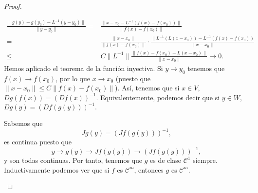 \begin{proof}
\begin{description}
	\[
	\begin{split}
		\frac{\|g\left(y\right)-g\left(y_{0}\right)-L^{-1}\left(y-y_{0}\right)\|}{\|y-y_{0}\|} = & \frac{\|x-x_{0}-L^{-1}\left(f\left(x\right)-f\left(x_{0}\right)\right)\|}{\|f\left(x\right)-f\left(x_{0}\right)\|} \\
		= & \frac{\|x-x_{0}\|}{\|f\left(x\right)-f\left(x_{0}\right)\|} \cdot \frac{\|L^{-1}\left(L\left(x-x_{0}\right)\right)-L^{-1}\left(f\left(x\right)-f\left(x_{0}\right)\right)}{\|x-x_{0}\|} \\
		\leq &  C \|L^{-1}\| \frac{\|f\left(x\right)-f\left(x_{0}\right)-L\left(x-x_{0}\right)\|}{\|x-x_{0}\|}  \to 0.
	\end{split}
	\]
	Hemos aplicado el teorema de la función inyectiva. Si $\displaystyle y \to y_{0} $ tenemos que $\displaystyle f\left(x\right) \to f\left(x_{0}\right) $, por lo que $\displaystyle x \to x_{0} $ (puesto que $\displaystyle \|x-x_{0}\| \leq C\|f\left(x\right)-f\left(x_{0}\right)\| $). 
Así, tenemos que si $\displaystyle x \in V $, $\displaystyle Dg\left(f\left(x\right)\right) = \left(Df\left(x\right)\right)^{-1} $. Equivalentemente, podemos decir que si $\displaystyle y \in W $, $\displaystyle Dg\left(y\right) = \left(Df\left(g\left(y\right)\right)\right)^{-1} $.
\item[Paso 6.] Sabemos que 
	\[Jg\left(y\right) = \left(Jf\left(g\left(y\right)\right)\right)^{-1} ,\]
	es continua puesto que 
	\[y \to g\left(y\right) \to Jf\left(g\left(y\right)\right) \to \left(Jf\left(g\left(y\right)\right)\right)^{-1} ,\]
	y son todas continuas. Por tanto, tenemos que $\displaystyle g $ es de clase $\displaystyle \mathcal{C}^{1} $ siempre. Inductivamente podemos ver que si $\displaystyle f $ es $ \mathcal{C}^{m} $, entonces $\displaystyle g $ es $  \mathcal{C}^{m} $. 
\end{description}
\end{proof}
